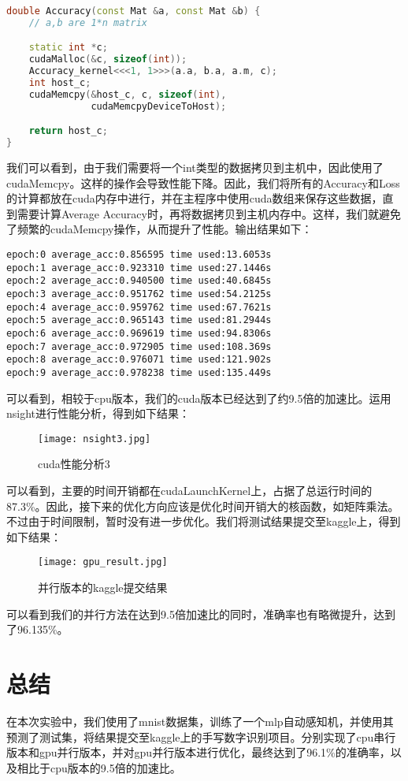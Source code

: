 \documentclass{ctexart}
\begin{document}
\begin{sloppypar}
\begin{lstlisting}[language=C++]
double Accuracy(const Mat &a, const Mat &b) {
    // a,b are 1*n matrix

    static int *c;
    cudaMalloc(&c, sizeof(int));
    Accuracy_kernel<<<1, 1>>>(a.a, b.a, a.m, c);
    int host_c;
    cudaMemcpy(&host_c, c, sizeof(int),
               cudaMemcpyDeviceToHost);

    return host_c;
}
\end{lstlisting}
我们可以看到，由于我们需要将一个int类型的数据拷贝到主机中，因此使用了cudaMemcpy。这样的操作会导致性能下降。因此，我们将所有的Accuracy和Loss的计算都放在cuda内存中进行，并在主程序中使用cuda数组来保存这些数据，直到需要计算Average Accuracy时，再将数据拷贝到主机内存中。这样，我们就避免了频繁的cudaMemcpy操作，从而提升了性能。输出结果如下：
\begin{lstlisting}
epoch:0 average_acc:0.856595 time used:13.6053s
epoch:1 average_acc:0.923310 time used:27.1446s
epoch:2 average_acc:0.940500 time used:40.6845s
epoch:3 average_acc:0.951762 time used:54.2125s
epoch:4 average_acc:0.959762 time used:67.7621s
epoch:5 average_acc:0.965143 time used:81.2944s
epoch:6 average_acc:0.969619 time used:94.8306s
epoch:7 average_acc:0.972905 time used:108.369s
epoch:8 average_acc:0.976071 time used:121.902s
epoch:9 average_acc:0.978238 time used:135.449s
\end{lstlisting}
可以看到，相较于cpu版本，我们的cuda版本已经达到了约9.5倍的加速比。运用nsight进行性能分析，得到如下结果：
\begin{figure}[H]
    \centering
    \texttt{[image: nsight3.jpg]}
    \caption{cuda性能分析3}
\end{figure}
可以看到，主要的时间开销都在cudaLaunchKernel上，占据了总运行时间的87.3\%。因此，接下来的优化方向应该是优化时间开销大的核函数，如矩阵乘法。不过由于时间限制，暂时没有进一步优化。我们将测试结果提交至kaggle上，得到如下结果：
\begin{figure}[H]
    \centering
    \texttt{[image: gpu\_result.jpg]}
    \caption{并行版本的kaggle提交结果}
\end{figure}
可以看到我们的并行方法在达到9.5倍加速比的同时，准确率也有略微提升，达到了96.135\%。
\section{总结}
在本次实验中，我们使用了mnist数据集，训练了一个mlp自动感知机，并使用其预测了测试集，将结果提交至kaggle上的手写数字识别项目。分别实现了cpu串行版本和gpu并行版本，并对gpu并行版本进行优化，最终达到了96.1\%的准确率，以及相比于cpu版本的9.5倍的加速比。


\end{sloppypar}
\end{document}
